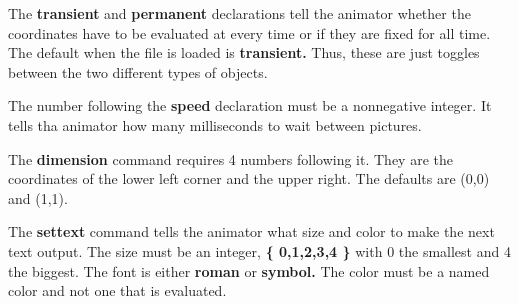 \documentclass{article}
\begin{document}
The {\bf transient} and {\bf permanent} declarations tell the animator
whether the coordinates have to be evaluated at every time or if they
are fixed for all time.  The default when the file is loaded is {\bf
transient.}  Thus, these are just toggles between the two different
types of objects.

The number following the {\bf speed} declaration must be a nonnegative
integer. It tells tha animator how many milliseconds to wait between
pictures.

The {\bf dimension} command requires 4 numbers following it. They are
the coordinates of the lower left corner and the upper right. The
defaults are (0,0) and (1,1).

The {\bf settext} command tells the animator what size and color to
make the next text output. The size must be an integer, {\bf \{
0,1,2,3,4 \} } with 0 the smallest and 4 the biggest. The font is
either {\bf roman} or {\bf symbol.}  The color must be a named color
and not one that is evaluated.
\end{document}
